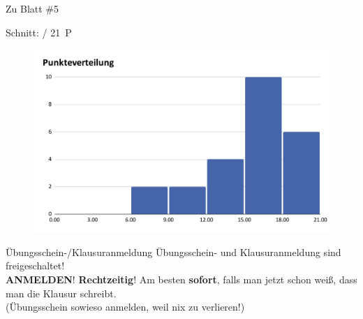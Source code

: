 



\morescalingdelimiters



\begin{frame}{Zu Blatt \#5}
	
	Schnitt:  / 21~P
	
	\pause
	\begin{figure}
	    \centering
	    \includegraphics[scale=0.45]{./Punkteverteilung.pdf}
	\end{figure}
\end{frame}


\begin{frame}{Übungsschein-/Klausuranmeldung}
	\centering \Large Übungsschein- und Klausuranmeldung sind freigeschaltet! \\
	\bigskip
	\Impl \textbf{ANMELDEN}! \textbf{Rechtzeitig}! Am besten \textbf{sofort}, falls man jetzt schon weiß, dass man die Klausur schreibt. \\
	\bigskip
	(Übungsschein sowieso anmelden, weil nix zu verlieren!)
\end{frame}

\framePrevEpisode

